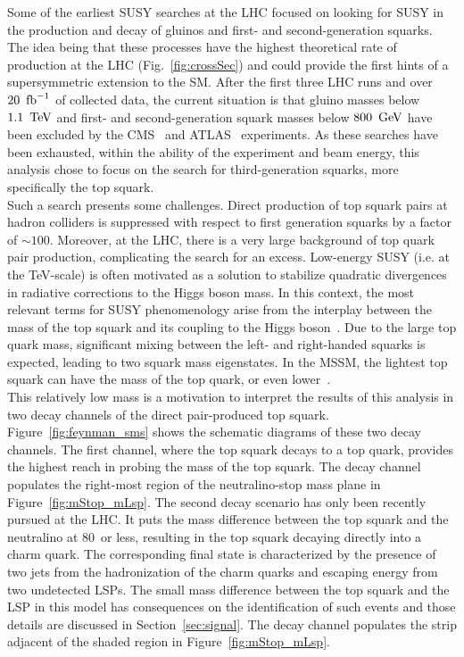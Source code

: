 \indent Some of the earliest SUSY searches at the LHC focused on 
looking for SUSY in the production and decay of gluinos and first- and 
second-generation squarks. The idea being that these processes have the highest 
theoretical rate of production at the LHC (Fig.~\ref{fig:crossSec}) and could provide the first hints of a 
supersymmetric extension to the SM. After the first three LHC runs and over $20~\mbox{\ensuremath{\,\text{fb}^\text{$-$1}}}$ of
collected data, the current situation is that gluino masses below $1.1~\,\text{Te\hspace{-.08em}V}$ and first- and 
second-generation squark masses below $800~\,\text{Ge\hspace{-.08em}V}$ have been excluded by the CMS~\cite{cms-susy} 
and ATLAS~\cite{atlas-susy} experiments. As these searches have been exhausted, within the ability of the 
experiment and beam energy, this analysis chose to focus on the search for third-generation 
squarks, more specifically the top squark.\\
\indent Such a search presents some challenges. Direct production of top squark pairs at hadron 
colliders is suppressed with respect to first generation squarks by a factor of $\sim100$.  Moreover, at 
the LHC, there is a very large background of top quark pair production, complicating the search for an excess.
Low-energy SUSY (i.e. at the TeV-scale) is often motivated as a solution to 
stabilize quadratic divergences in radiative corrections to the Higgs boson mass. In this
context, the most relevant terms for SUSY phenomenology arise from the interplay between 
the mass of the top squark and its coupling to the Higgs boson~\cite{Agashe:2014kda}. 
Due to the large top quark mass, significant mixing between the left- and right-handed squarks
is expected, leading to two squark mass eigenstates. In the MSSM, the lightest top squark
can have the mass of the top quark, or even lower~\cite{Martin:1997ns}.\\
\indent This relatively low mass is a motivation to interpret the results of this 
analysis in two decay channels of the direct pair-produced top squark. Figure~\ref{fig:feynman_sms} shows 
the schematic diagrams of these two decay channels. 
The first channel, where the top squark decays to a top quark, provides the highest reach 
in probing the mass of the top squark. The decay channel populates the right-most region of the 
neutralino-stop mass plane in Figure~\ref{fig:mStop_mLsp}.
The second decay scenario has only been recently pursued at the LHC. It puts 
the mass difference between the top squark and the neutralino at 80~\GeV or 
less, resulting in the top squark decaying directly into a charm quark. 
The corresponding final state is characterized by the presence of two jets from 
the hadronization of the charm quarks and escaping energy from two undetected LSPs.
The small mass difference between the top squark and the LSP in this model has consequences on the 
identification of such events and those details are discussed in Section~\ref{sec:signal}.
The decay channel populates the strip adjacent of the shaded region in Figure~\ref{fig:mStop_mLsp}.


